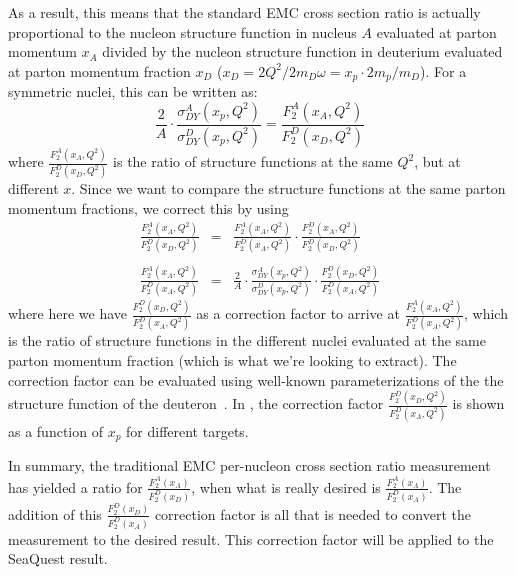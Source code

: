 As a result, this means that the standard EMC cross section ratio is actually proportional to the nucleon structure function in nucleus $A$ evaluated at parton momentum $x_A$ divided by the nucleon structure function in deuterium evaluated at parton momentum fraction $x_D$ ($x_D = 2Q^2/2m_D\omega = x_p \cdot 2m_p/m_D$)\cite{Hen:2013oha}. For a symmetric nuclei, this can be written as:
\begin{equation}
\frac{2}{A} \cdot \frac{\sigma^A_{DY}(x_p, Q^2)}{\sigma^D_{DY}(x_p, Q^2)} = \frac{F_2^A(x_A, Q^2)}{F_2^D(x_D, Q^2)}
\end{equation}
where $\frac{F_2^A(x_A, Q^2)}{F_2^D(x_D, Q^2)}$ is the ratio of structure functions at the same $Q^2$, but at different $x$. Since we want to compare the structure functions at the same parton momentum fractions, we correct this by using
\begin{eqnarray}
\frac{F_2^A(x_A, Q^2)}{F_2^D(x_D, Q^2)} & = & \frac{F_2^A(x_A, Q^2)}{F_2^D(x_A, Q^2)} \cdot \frac{F_2^D(x_A, Q^2)}{F_2^D(x_D, Q^2)} \\
& & \nonumber \\
\frac{F_2^A(x_A, Q^2)}{F_2^D(x_A, Q^2)} & = & \frac{2}{A} \cdot \frac{\sigma^A_{DY}(x_p, Q^2)}{\sigma^D_{DY}(x_p, Q^2)} \cdot \frac{F_2^D(x_D, Q^2)}{F_2^D(x_A, Q^2)}
\label{eq:struc-func-ratio-xA}
\end{eqnarray}
where here we have $\frac{F_2^D(x_D, Q^2)}{F_2^D(x_A, Q^2)}$ as a correction factor to arrive at $\frac{F_2^A(x_A, Q^2)}{F_2^D(x_A, Q^2)}$, which is the ratio of structure functions in the different nuclei evaluated at the same parton momentum fraction (which is what we're looking to extract). The correction factor can be evaluated using well-known parameterizations of the the structure function of the deuteron~\cite{Whitlow:1991uw,Bosted:2007xd}. In , the correction factor $\frac{F_2^D(x_D, Q^2)}{F_2^D(x_A, Q^2)}$ is shown as a function of $x_p$ for different targets.

In summary, the traditional EMC per-nucleon cross section ratio measurement has yielded a ratio for $\frac{F_2^A(x_A)}{F_2^D(x_D)}$, when what is really desired is $\frac{F_2^A(x_A)}{F_2^D(x_A)}$. The addition of this $\frac{F_2^D(x_D)}{F_2^D(x_A)}$ correction factor is all that is needed to convert the measurement to the desired result. This correction factor will be applied to the SeaQuest result.
